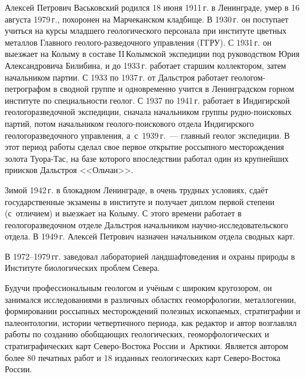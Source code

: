 



\makeProcTitleII
{}


Алексей Петрович Васьковский родился 18 июня 1911\,г. в Ленинграде, умер в 16 августа 1979\,г., похоронен на Марчеканском кладбище. В 1930\,г. он поступает учиться на курсы младшего геологического персонала при институте цветных металлов Главного геолого-разведочного управления \mbox{(ГГРУ)}. С 1931\,г. он выезжает на Колыму в составе II\,Колымской экспедиции под руководством Юрия Александровича Билибина, и до 1933\,г. работает старшим коллектором, затем начальником партии. С 1933 по 1937\,г. от Дальстроя работает геологом-петрографом в сводной группе и одновременно учится в Ленинградском горном институте по специальности геолог. С 1937 по 1941\,г. работает в Индигирской геологоразведочной экспедиции, сначала начальником группы рудно-поисковых партий, потом начальником геолого-поискового отдела Индигирского геологоразведочного управления, а~с~1939\,г.~--- главный геолог экспедиции. В этот период работы сделал свое первое открытие россыпного месторождения золота Туора-Тас, на базе которого впоследствии работал один из крупнейших приисков Дальстроя <<Ольчан>>.

Зимой 1942\,г. в блокадном Ленинграде, в очень трудных условиях, сдаёт государственные экзамены в институте и получает диплом первой степени (с~отличием) и выезжает на Колыму. С этого времени работает в геологоразведочном отделе Дальстроя начальником научно-исследовательского отдела. В 1949\,г. Алексей Петрович назначен начальником отдела сводных карт.

В 1972--1979\,гг. заведовал лабораторией ландшафтоведения и охраны природы в Институте биологических проблем Севера.

Будучи профессиональным геологом и учёным с широким кругозором, он занимался исследованиями в различных областях геоморфологии, металлогении, формировании россыпных месторождений полезных ископаемых, стратиграфии и палеонтологии, истории четвертичного периода, как редактор и автор возглавлял работы по созданию обобщающих геологических, геоморфологических и стратиграфических карт Северо-Востока России и~Арктики. Является автором более 80 печатных работ и 18 изданных геологических карт Северо-Востока России.

